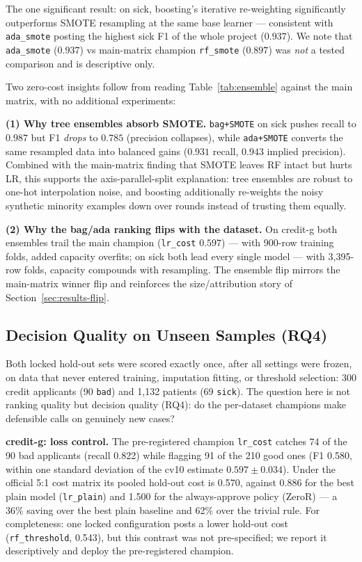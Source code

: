 The one significant result: on sick, boosting's iterative re-weighting significantly outperforms SMOTE resampling at the same base learner --- consistent with \texttt{ada\_smote} posting the highest sick F1 of the whole project ($0.937$). We note that \texttt{ada\_smote} ($0.937$) vs main-matrix champion \texttt{rf\_smote} ($0.897$) was \emph{not} a tested comparison and is descriptive only.

Two zero-cost insights follow from reading Table~\ref{tab:ensemble} against the main matrix, with no additional experiments:

\textbf{(1) Why tree ensembles absorb SMOTE.} \texttt{bag+SMOTE} on sick pushes recall to $0.987$ but F1 \emph{drops} to $0.785$ (precision collapses), while \texttt{ada+SMOTE} converts the same resampled data into balanced gains ($0.931$ recall, $0.943$ implied precision). Combined with the main-matrix finding that SMOTE leaves RF intact but hurts LR, this supports the axis-parallel-split explanation: tree ensembles are robust to one-hot interpolation noise, and boosting additionally re-weights the noisy synthetic minority examples down over rounds instead of trusting them equally.

\textbf{(2) Why the bag/ada ranking flips with the dataset.} On credit-g both ensembles trail the main champion (\texttt{lr\_cost} $0.597$) --- with 900-row training folds, added capacity overfits; on sick both lead every single model --- with 3{,}395-row folds, capacity compounds with resampling. The ensemble flip mirrors the main-matrix winner flip and reinforces the size/attribution story of Section~\ref{sec:results-flip}.

\subsection{Decision Quality on Unseen Samples (RQ4)}
\label{sec:results-holdout}

Both locked hold-out sets were scored exactly once, after all settings were frozen, on data that never entered training, imputation fitting, or threshold selection: 300 credit applicants (90 \texttt{bad}) and 1{,}132 patients (69 \texttt{sick}). The question here is not ranking quality but decision quality (RQ4): do the per-dataset champions make defensible calls on genuinely new cases?

\textbf{credit-g: loss control.} The pre-registered champion \texttt{lr\_cost} catches 74 of the 90 bad applicants (recall 0.822) while flagging 91 of the 210 good ones (F1 0.580, within one standard deviation of the cv10 estimate $0.597\pm0.034$). Under the official 5:1 cost matrix its pooled hold-out cost is 0.570, against 0.886 for the best plain model (\texttt{lr\_plain}) and 1.500 for the always-approve policy (ZeroR) --- a 36\% saving over the best plain baseline and 62\% over the trivial rule. For completeness: one locked configuration posts a lower hold-out cost (\texttt{rf\_threshold}, 0.543), but this contrast was not pre-specified; we report it descriptively and deploy the pre-registered champion.

